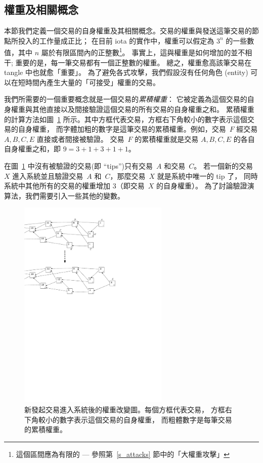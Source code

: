 \documentclass[12pt]{article}
\begin{document}
\begin{CJK}{UTF8}{bkai}
\section{權重及相關概念}
\label{s_weight_algo}
本節我們定義一個交易的自身權重及其相關概念。交易的權重與發送這筆交易的節點所投入的工作量成正比；
在目前 iota 的實作中，權重可以假定為 $3^n$ 的一些數值，其中 $n$ 屬於有限區間內的正整數\footnote{這個區間應為有限的 --- 
參照第~\ref{s_attacks} 節中的「大權重攻擊」}。
事實上，這與權重是如何增加的並不相干; 重要的是，每一筆交易都有一個正整數的權重。
總之，權重愈高該筆交易在 tangle 中也就愈「重要」。
為了避免各式攻擊，我們假設沒有任何角色 (entity) 可以在短時間內產生大量的「可接受」權重的交易。
 
我們所需要的一個重要概念就是一個交易的\emph{累積權重}：
它被定義為這個交易的自身權重與其他直接以及間接驗證這個交易的所有交易的自身權重之和。
累積權重的計算方法如圖~\ref{f_weights} 所示。其中方框代表交易，方框右下角較小的數字表示這個交易的自身權重，
而字體加粗的數字是這筆交易的累積權重。例如，交易~$F$ 經交易 $A,B,C,E$  直接或者間接被驗證。
交易~$F$ 的累積權重就是交易 $A,B,C,E$ 的各自自身權重之和，即 $9=3+1+3+1+1$。

在圖~\ref{f_weights} 中沒有被驗證的交易(即 “tips”)只有交易~$A$ 和交易~$C$。
若一個新的交易~$X$ 進入系統並且驗證交易~$A$ 和~$C$，那麼交易~$X$ 就是系統中唯一的 tip 了，
同時系統中其他所有的交易的權重增加 3（即交易~$X$ 的自身權重）。
為了討論驗證演算法，我們需要引入一些其他的變數。

\begin{figure}
 \centering \includegraphics[width=0.64\textwidth]{weights} 
\caption{新發起交易進入系統後的權重改變圖。每個方框代表交易，
方框右下角較小的數字表示這個交易的自身權重，
而粗體數字是每筆交易的累積權重。}
\label{f_weights}
\end{figure}


\end{CJK}
\end{document}

